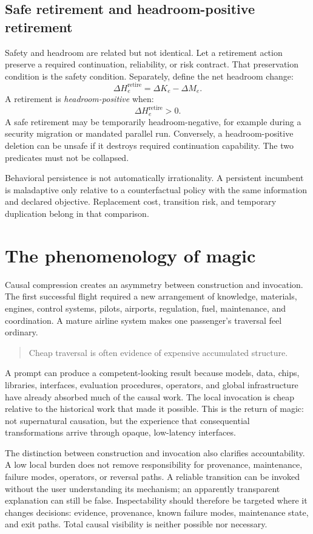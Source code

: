 \documentclass[11pt]{article}
\begin{document}
\subsection{Safe retirement and headroom-positive retirement}

Safety and headroom are related but not identical. Let a retirement action preserve a required continuation, reliability, or risk contract. That preservation condition is the safety condition. Separately, define the net headroom change:
\[
\Delta H_e^{\mathrm{retire}}=\Delta K_e-\Delta M_e.
\]
A retirement is \emph{headroom-positive} when:
\[
\Delta H_e^{\mathrm{retire}}>0.
\]
A safe retirement may be temporarily headroom-negative, for example during a security migration or mandated parallel run. Conversely, a headroom-positive deletion can be unsafe if it destroys required continuation capability. The two predicates must not be collapsed.

Behavioral persistence is not automatically irrationality. A persistent incumbent is maladaptive only relative to a counterfactual policy with the same information and declared objective. Replacement cost, transition risk, and temporary duplication belong in that comparison.

\section{The phenomenology of magic}

Causal compression creates an asymmetry between construction and invocation. The first successful flight required a new arrangement of knowledge, materials, engines, control systems, pilots, airports, regulation, fuel, maintenance, and coordination. A mature airline system makes one passenger's traversal feel ordinary.

\begin{quote}
Cheap traversal is often evidence of expensive accumulated structure.
\end{quote}

A prompt can produce a competent-looking result because models, data, chips, libraries, interfaces, evaluation procedures, operators, and global infrastructure have already absorbed much of the causal work. The local invocation is cheap relative to the historical work that made it possible. This is the return of magic: not supernatural causation, but the experience that consequential transformations arrive through opaque, low-latency interfaces.

The distinction between construction and invocation also clarifies accountability. A low local burden does not remove responsibility for provenance, maintenance, failure modes, operators, or reversal paths. A reliable transition can be invoked without the user understanding its mechanism; an apparently transparent explanation can still be false. Inspectability should therefore be targeted where it changes decisions: evidence, provenance, known failure modes, maintenance state, and exit paths. Total causal visibility is neither possible nor necessary.
\end{document}
